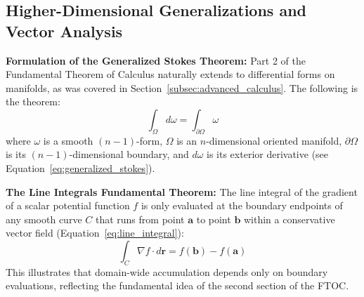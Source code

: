 \documentclass[11pt, a4paper]{article}
\begin{document}
\subsection{Higher-Dimensional Generalizations and Vector Analysis}
\textbf{Formulation of the Generalized Stokes Theorem:}
Part 2 of the Fundamental Theorem of Calculus naturally extends to differential forms on manifolds, as was covered in Section~\ref{subsec:advanced_calculus}. The following is the theorem:
\[
\int_{\Omega} d\omega = \int_{\partial\Omega} \omega
\]
where $\omega$ is a smooth $(n-1)$-form, $\Omega$ is an $n$-dimensional oriented manifold, $\partial\Omega$ is its $(n-1)$-dimensional boundary, and $d\omega$ is its exterior derivative (see Equation~\ref{eq:generalized_stokes}).

\vspace{1em}
\noindent \textbf{The Line Integrals Fundamental Theorem:}
The line integral of the gradient of a scalar potential function $f$ is only evaluated at the boundary endpoints of any smooth curve $C$ that runs from point $\mathbf{a}$ to point $\mathbf{b}$ within a conservative vector field (Equation~\ref{eq:line_integral}):
\[
\int_{C} \nabla f \cdot d\mathbf{r} = f(\mathbf{b}) - f(\mathbf{a})
\]
This illustrates that domain-wide accumulation depends only on boundary evaluations, reflecting the fundamental idea of the second section of the FTOC.
\end{document}
